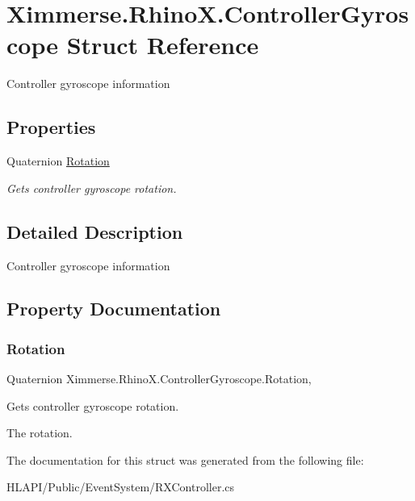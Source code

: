 \hypertarget{struct_ximmerse_1_1_rhino_x_1_1_controller_gyroscope}{}\section{Ximmerse.\+Rhino\+X.\+Controller\+Gyroscope Struct Reference}
\label{struct_ximmerse_1_1_rhino_x_1_1_controller_gyroscope}


Controller gyroscope information  


\subsection*{Properties}
\begin{DoxyCompactItemize}
\item 
Quaternion \mbox{\hyperlink{struct_ximmerse_1_1_rhino_x_1_1_controller_gyroscope_a694963cea4f05271994cf1ffcaae5dec}{Rotation}}
\begin{DoxyCompactList}\small\item\em Gets controller gyroscope rotation. \end{DoxyCompactList}\end{DoxyCompactItemize}


\subsection{Detailed Description}
Controller gyroscope information 



\subsection{Property Documentation}
\mbox{\label{struct_ximmerse_1_1_rhino_x_1_1_controller_gyroscope_a694963cea4f05271994cf1ffcaae5dec}} 
\subsubsection{\texorpdfstring{Rotation}{Rotation}}
{\footnotesize\ttfamily Quaternion Ximmerse.\+Rhino\+X.\+Controller\+Gyroscope.\+Rotation\hspace{0.3cm}{\ttfamily [get]}, {\ttfamily [set]}}



Gets controller gyroscope rotation. 

The rotation.

The documentation for this struct was generated from the following file\+:\begin{DoxyCompactItemize}
\item 
H\+L\+A\+P\+I/\+Public/\+Event\+System/R\+X\+Controller.\+cs\end{DoxyCompactItemize}
